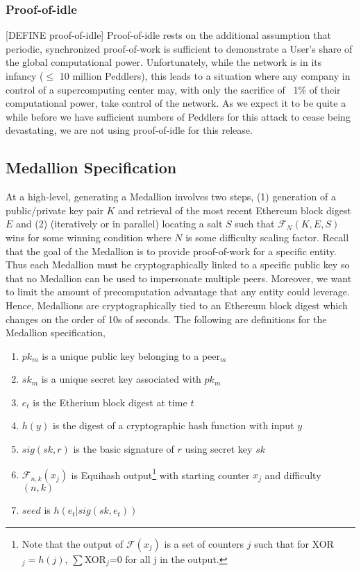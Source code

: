\subsubsection{Proof-of-idle}

{\color{red}[DEFINE proof-of-idle]} Proof-of-idle rests on the additional assumption that periodic, synchronized proof-of-work is sufficient to demonstrate a User’s share of the global computational power. Unfortunately, while the network is in its infancy ($\leq$ 10 million Peddlers), this leads to a situation where any company in control of a supercomputing center may, with only the sacrifice of ~1\% of their computational power, take control of the network. As we expect it to be quite a while before we have sufficient numbers of Peddlers for this attack to cease being devastating, we are not using proof-of-idle for this release.

\subsection{Medallion Specification}
\label{medallion-spec}

At a high-level, generating a Medallion involves two steps, (1) generation of a public/private key pair $K$ and retrieval of the most recent Ethereum block digest $E$ and (2) (iteratively or in parallel) locating a salt $S$ such that $\mathcal{F}_{N}(K, E, S)$ wins for some winning condition where $N$ is some difficulty scaling factor. Recall that the goal of the Medallion is to provide proof-of-work for a specific entity. Thus each Medallion must be cryptographically linked to a specific public key so that no Medallion can be used to impersonate multiple peers. Moreover, we want to limit the amount of precomputation advantage that any entity could leverage. Hence, Medallions are cryptographically tied to an Ethereum block digest which changes on the order of 10s of seconds. The following are definitions for the Medallion specification,

\begin{enumerate}
	\item[] $pk_m$ is a unique public key belonging to a peer$_m$
    \item[] $sk_m$ is a unique secret key associated with $pk_m$
    \item[] $e_t$ is the Etherium block digest at time $t$ 
    \item[] $h(y)$ is the digest of a cryptographic hash function with input $y$
    \item[] $sig(sk, r)$ is the basic signature of $r$ using secret key $sk$
    \item[] $\mathcal{F}_{n,k}(x_j)$ is Equihash output\footnote{Note that the output of $\mathcal{F}(x_j)$ is a set of counters $j$ such that for XOR$_j=h(j)$, $\sum$XOR$_j$=0 for all j in the output.} with starting counter $x_j$ and difficulty $(n,k)$
    \item[] $seed$ is $h(e_t|sig(sk,e_t))$
\end{enumerate}

